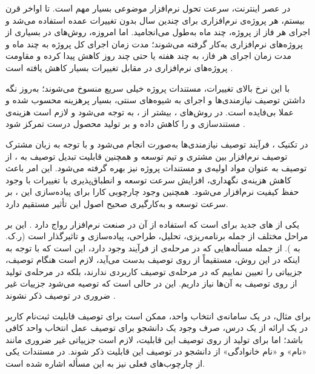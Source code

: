   

در عصر اینترنت، سرعت تحول نرم‌افزار موضوعی بسیار مهم است. تا اواخر قرن
بیستم، هر پروژه‌ی نرم‌افزاری برای چندین سال بدون تغییرات عمده استفاده
می‌شد و اجرای هر فاز از پروژه، چند ماه به‌طول می‌انجامید. اما
امروزه، روش‌های  در بسیاری از پروژه‌های نرم‌افزاری به‌کار
گرفته می‌شوند؛ مدت زمان اجرای کل پروژه به چند ماه و مدت زمان اجرای هر
فاز، به چند هفته یا حتی چند روز کاهش پیدا کرده و مقاومت پروژه‌های
نرم‌افزاری در مقابل تغییرات بسیار کاهش یافته است .

با این نرخ بالای تغییرات، مستندات پروژه خیلی سریع منسوخ می‌شوند؛ به‌روز
نگه داشتن توصیف نیازمندی‌ها و اجرای  به شیوه‌های سنتی، بسیار
پرهزینه محسوب شده و عملا بی‌فایده است. در روش‌های ،
بیشتر از ، به
 توجه می‌شود و لازم
است هزینه‌ی مستندسازی و  را کاهش داده و بر تولید محصول درست
تمرکز شود .

در تکنیک ، فرآیند توصیف نیازمندی‌ها به‌صورت
 انجام می‌شود و با توجه به زبان مشترک توصیف نرم‌افزار بین مشتری و
تیم توسعه و همچنین قابلیت تبدیل توصیف به ، از توصیف به
عنوان مواد اولیه‌ی  و
مستندات پروژه نیز بهره گرفته می‌شود. این امر باعث کاهش هزینه‌ی نگهداری،
افزایش سرعت توسعه  و انطباق‌پذیری با تغییرات با وجود حفظ
کیفیت نرم‌افزار می‌شود. همچنین وجود چارچوبی کارا برای پیاده‌سازی این
، بر سرعت توسعه و به‌کارگیری صحیح اصول این 
تأثیر مستقیم دارد.

  یکی
از ‌های جدید برای  است که استفاده از آن در
صنعت نرم‌افزار رواج دارد . این  بر
مراحل مختلف  از جمله برنامه‌ریزی، تحلیل، طراحی،
پیاده‌سازی و  تاثیرگذار است (ر.ک. به
). از جمله مسأله‌هایی که در مرحله‌ی  از
فرآیند  وجود دارد، این است که با توجه به اینکه
 در این روش، مستقیماً از روی توصیف بدست می‌آید،
لازم است هنگام توصیف، جزییاتی را تعیین نماییم که در مرحله‌ی توصیف
کاربردی ندارند، بلکه در مرحله‌ی تولید  از روی توصیف
به آن‌ها نیاز داریم. این در حالی است که توصیه می‌شود جزییات غیر ضروری
در توصیف ذکر نشوند .

برای مثال، در یک سامانه‌ی انتخاب واحد، ممکن است برای توصیف قابلیت
ثبت‌نام کاربر در یک ارائه از یک درس، صرف وجود یک دانشجو برای توصیف عمل
انتخاب واحد کافی باشد؛ اما برای تولید  از روی توصیف
این قابلیت، لازم است جزییاتی غیر ضروری مانند «نام» و «نام خانوادگی» از دانشجو
در توصیف این قابلیت ذکر شوند. در مستندات یکی از چارچوب‌های فعلی 
  نیز به این مسأله اشاره شده است.

